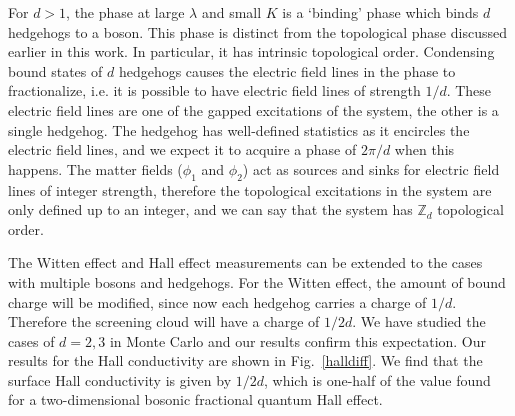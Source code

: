 \documentclass[prb,twocolumn]{revtex4-1}
\begin{document}
For $d>1$, the phase at large $\lambda$ and small $K$ is a `binding' phase which binds $d$ hedgehogs to a boson. This phase is distinct from the topological phase discussed earlier in this work. In particular, it has intrinsic topological order. Condensing bound states of $d$ hedgehogs causes the electric field lines in the phase to fractionalize, i.e. it is possible to have electric field lines of strength $1/d$. These electric field lines are one of the gapped excitations of the system, the other is a single hedgehog. The hedgehog has well-defined statistics as it encircles the electric field lines, and we expect it to acquire a phase of $2\pi/d$ when this happens. The matter fields ($\phi_1$ and $\phi_2$) act as sources and sinks for electric field lines of integer strength, therefore the topological excitations in the system are only defined up to an integer, and we can say that the system has $\mathbb{Z}_d$ topological order.


The Witten effect and Hall effect measurements can be extended to the cases with multiple bosons and hedgehogs. For the Witten effect, the amount of bound charge will be modified, since now each hedgehog carries a charge of $1/d$. Therefore the screening cloud will have a charge of $1/2d$. We have studied the cases of $d=2,3$ in Monte Carlo and our results confirm this expectation. 
Our results for the Hall conductivity are shown in Fig.~\ref{halldiff}. We find that the surface Hall conductivity is given by $1/2d$, which is one-half of the value found for a two-dimensional bosonic fractional quantum Hall effect.
\end{document}
